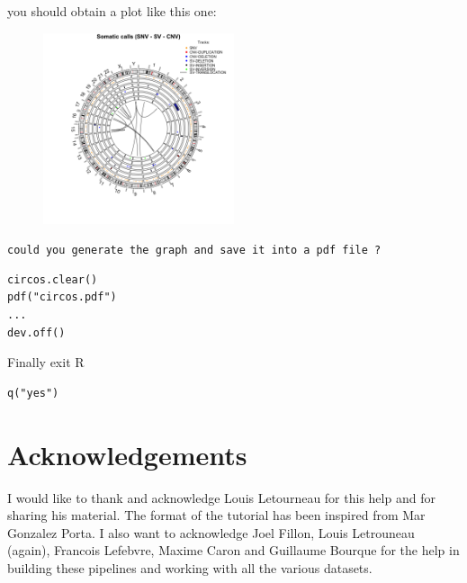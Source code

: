 you should obtain a plot like this one:
\begin{figure}[h]
\includegraphics[width=0.5\textwidth]{circos.png}
\end{figure}

\begin{questions}
\texttt{could you generate the graph and save it into a pdf file ?}
\end{questions}

\begin{answer}
\begin{steps}
\begin{lstlisting}
circos.clear()
pdf("circos.pdf")
...
dev.off()
\end{lstlisting}
\end{steps}
\end{answer}

Finally exit R

\begin{steps}
\begin{lstlisting}
q("yes")
\end{lstlisting}
\end{steps}


\newpage


\section{Acknowledgements}
I would like to thank and acknowledge Louis Letourneau for this help and for sharing his material. The format of the tutorial has been inspired from Mar Gonzalez Porta. I also want to acknowledge Joel Fillon, Louis Letrouneau (again), Francois Lefebvre, Maxime Caron and Guillaume Bourque for the help in building these pipelines and working with all the various datasets.
